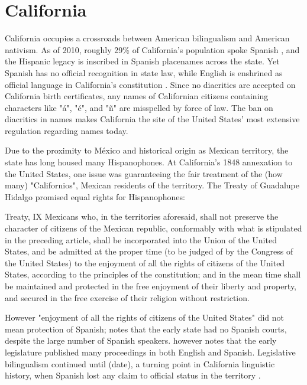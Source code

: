 \section{California}

California occupies a crossroads between American bilingualism and American
nativism. As of 2010, roughly 29\% of California's population spoke Spanish
\parencite{acs-lang-states}, and the Hispanic legacy is inscribed in Spanish
placenames across the state. Yet Spanish has no official recognition in state
law, while English is enshrined as official language in California's
constitution \parencite{ca-const}. Since no diacritics are accepted on
California birth certificates, any names of Californian citizens containing
characters like "á", "é", and "ñ" are misspelled by force of law. The ban on
diacritics in names makes California the site of the United States' most
extensive regulation regarding names today.

Due to the proximity to México and historical origin as Mexican territory, the
state has long housed many Hispanophones. At California's 1848 annexation to the
United States, one issue was guaranteeing the fair treatment of the (how many)
"Californios", Mexican residents of the territory. The Treaty of Guadalupe
Hidalgo promised equal rights for Hispanophones: 

\begin{aquote}{Treaty, IX}
	Mexicans who, in the territories aforesaid, shall not preserve the character
	of citizens of the Mexican republic, conformably with what is stipulated in
	the preceding article, shall be incorporated into the Union of the United
	States, and be admitted at the proper time (to be judged of by the Congress of
	the United States) to the enjoyment of all the rights of citizens of the
	United States, according to the principles of the constitution; and in the
	mean time shall be maintained and protected in the free enjoyment of their
	liberty and property, and secured in the free exercise of their religion
	without restriction.
\end{aquote}

However "enjoyment of all the rights of citizens of the United States" did not
mean protection of Spanish; \textcite{lamar-prieto14} notes that the
early state had no Spanish courts, despite the large number of Spanish speakers.
\textcite{baron92} however notes that the early legislature published many
proceedings in both English and Spanish. Legislative bilingualism continued
until (date), a turning point in California linguistic history, when Spanish
lost any claim to official status in the territory \parencite{baron02}.

